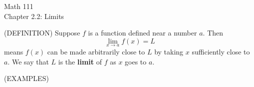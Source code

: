 \documentclass[11pt]{article}
\begin{document}
\begin{center}
\Large
\rm{Math 111}
\\
\rm{Chapter 2.2:  Limits}
\\
\end{center}
\vspace{0.2in}


(DEFINITION)  Suppose $f$ is a function defined near a number $a$.  Then 
\begin{displaymath}
  \lim_{x\to a}f(x) = L
  \end{displaymath}
means $f(x)$ can be made arbitrarily close to $L$ by taking $x$ sufficiently close to $a$.  We say that $L$ is the {\bf limit} of $f$ as $x$ goes to $a$.

\vspace{1.5in}

(EXAMPLES)
\end{document}
